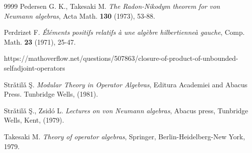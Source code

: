 \documentclass[12pt]{amsart}
\numberwithin{equation}{section}
\begin{document}
\begin{thebibliography}{9999}
 Pedersen G. K., Takesaki M.
{\it The Radon-Nikodym theorem for von Neumann algebras}, Acta Math. {\bf 130} (1973), 53-88.

 Perdrizet F.
{\it \'El\'ements positifs relatifs \`a une alg\`ebre hilbertienne\`a gauche}, Comp. Math. {\bf 23} (1971), 25-47.

 https://mathoverflow.net/questions/507863/closure-of-product-of-unbounded-selfadjoint-operators

  Str\v{a}til\v{a} \c{S}.  {\it Modular Theory in Operator Algebras}, Editura Academiei and Abacus Press. Tunbridge Wells, (1981).

 Str\v{a}til\v{a}  \c{S}., Zsid\'o L.
{\it Lectures on von Neumann algebras}, Abacus press, Tunbridge
Wells, Kent, (1979).

 Takesaki M. {\it Theory of operator algebras}, Springer, Berlin-Heidelberg-New
York, 1979.

\end{thebibliography}
\end{document}
